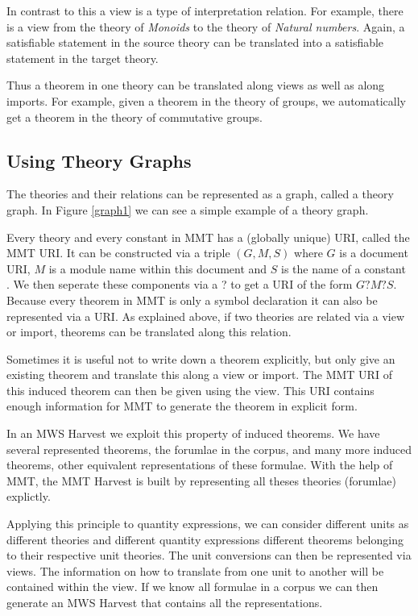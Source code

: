 \documentclass[11pt]{article}
\begin{document}
In contrast to this a view is a type of interpretation relation. For example, there is a view from the theory of \textit{Monoids} to the theory of \textit{Natural numbers}. Again, a satisfiable statement in the source theory can be translated into a satisfiable statement in the target theory.

Thus a theorem in one theory can be translated along views as well as along imports. For example, given a theorem in the theory of groups, we automatically get a theorem in the theory of commutative groups. 

\subsection{Using Theory Graphs}
\label{sec:mws:tg}

The theories and their relations can be represented as a graph, called a theory graph. In Figure \ref{graph1} we can see a simple example of a theory graph.


Every theory and every constant in MMT has a (globally unique) URI, called the MMT URI. It can be constructed via a triple $\left( G,M,S \right)$ where $G$ is a document URI, $M$ is a module name within this document and $S$ is the name of a constant \cite{RabKoh:WSMSML13}. We then seperate these components via a ? to get a URI of the form $G?M?S$. Because every theorem in MMT is only a symbol declaration it can also be represented via a URI. As explained above, if two theories are related via a view or import, theorems can be translated along this relation.

Sometimes it is useful not to write down a theorem explicitly, but only give an existing theorem and translate this along a view or import. The MMT URI of this induced theorem can then be given using the view. This URI contains enough information for MMT to generate the theorem in explicit form\cite{IanKohProd:rassmk14}.

In an MWS Harvest we exploit this property of induced theorems. We have several represented theorems, the forumlae in the corpus, and many more induced theorems, other equivalent representations of these formulae. With the help of MMT, the MMT Harvest is built by representing all theses theories (forumlae) explictly.

Applying this principle to quantity expressions, we can consider different units as different theories and different quantity expressions different theorems belonging to their respective unit theories. The unit conversions can then be represented via views. The information on how to translate from one unit to another will be contained within the view. If we know all formulae in a corpus we can then generate an MWS Harvest that contains all the representations.
\end{document}
